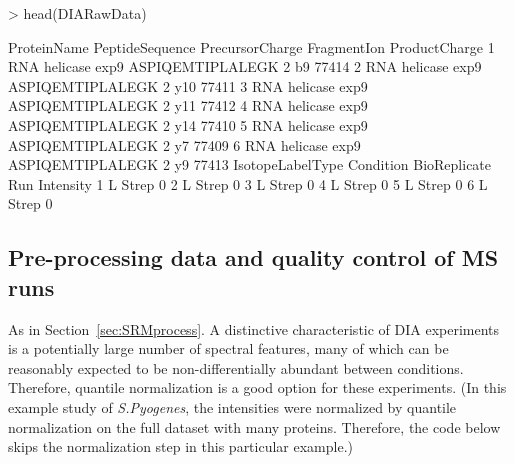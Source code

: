 \documentclass[11pt]{article}
\def\secref#1{Section~\ref{sec:#1}}
\begin{document}
\begin{small}
\begin{Schunk}
\begin{Sinput}
> head(DIARawData)
\end{Sinput}
\begin{Soutput}
         ProteinName  PeptideSequence PrecursorCharge FragmentIon ProductCharge
1 RNA  helicase exp9 ASPIQEMTIPLALEGK               2          b9         77414
2 RNA  helicase exp9 ASPIQEMTIPLALEGK               2         y10         77411
3 RNA  helicase exp9 ASPIQEMTIPLALEGK               2         y11         77412
4 RNA  helicase exp9 ASPIQEMTIPLALEGK               2         y14         77410
5 RNA  helicase exp9 ASPIQEMTIPLALEGK               2          y7         77409
6 RNA  helicase exp9 ASPIQEMTIPLALEGK               2          y9         77413
  IsotopeLabelType Condition BioReplicate Run Intensity
1                L  Strep 0%
2                L  Strep 0%
3                L  Strep 0%
4                L  Strep 0%
5                L  Strep 0%
6                L  Strep 0%
\end{Soutput}
\end{Schunk}
\end{small}

\subsection{Pre-processing data and quality control of MS runs}

As in \secref{SRMprocess}. A distinctive characteristic of DIA experiments is a potentially large number of spectral features, many of which can be reasonably expected to be non-differentially abundant between conditions. Therefore, quantile normalization is a good  option for these experiments. (In this example study of {\it S.Pyogenes}, the intensities were normalized by quantile normalization on the full dataset with many proteins. Therefore, the code below skips the normalization step in this particular example.)
\end{document}
